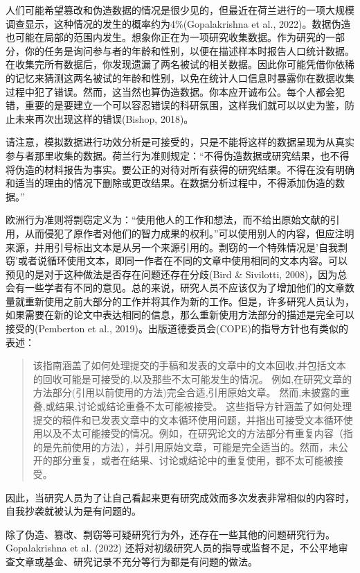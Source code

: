 \documentclass[
  letterpaper,
  DIV=11,
  numbers=noendperiod]{scrreprt}
\begin{document}
人们可能希望篡改和伪造数据的情况是很少见的，但最近在荷兰进行的一项大规模调查显示，这种情况的发生的概率约为4\%(Gopalakrishna
et al.,
2022)。数据伪造也可能在局部的范围内发生。想象你正在为一项研究收集数据。作为研究的一部分，你的任务是询问参与者的年龄和性别，以便在描述样本时报告人口统计数据。在收集完所有数据后，你发现遗漏了两名被试的相关数据。因此你可能凭借你依稀的记忆来猜测这两名被试的年龄和性别，以免在统计人口信息时暴露你在数据收集过程中犯了错误。然而，这当然也算伪造数据。你本应开诚布公。每个人都会犯错，重要的是要建立一个可以容忍错误的科研氛围，这样我们就可以以史为鉴，防止未来再次出现这样的错误(Bishop,
2018)。

请注意，模拟数据进行功效分析是可接受的，只是不能将这样的数据呈现为从真实参与者那里收集的数据。荷兰行为准则规定：``不得伪造数据或研究结果，也不得将伪造的材料报告为事实。要公正的对待对所有获得的研究结果。不得在没有明确和适当的理由的情况下删除或更改结果。在数据分析过程中，不得添加伪造的数据。''

欧洲行为准则将剽窃定义为：``使用他人的工作和想法，而不给出原始文献的引用，从而侵犯了原作者对他们的智力成果的权利。''可以使用别人的内容，但应注明来源，并用引号标出文本是从另一个来源引用的。剽窃的一个特殊情况是'自我剽窃'或者说循环使用文本，即同一作者在不同的文章中使用相同的文本内容。可以预见的是对于这种做法是否存在问题还存在分歧(Bird
\& Sivilotti,
2008)，因为总会有一些学者有不同的意见。总的来说，研究人员不应该仅为了增加他们的文章数量就重新使用之前大部分的工作并将其作为新的工作。但是，许多研究人员认为，如果需要在新的论文中表达相同的信息，那么重新使用方法部分的描述是完全可以接受的(Pemberton
et al., 2019)。出版道德委员会(COPE)的指导方针也有类似的表述：

\begin{quote}
该指南涵盖了如何处理提交的手稿和发表的文章中的文本回收,并包括文本的回收可能是可接受的,以及那些不太可能发生的情况。
例如,在研究文章的方法部分(引用以前使用的方法)完全合适,引用原始文章。
然而,未披露的重叠,或结果,讨论或结论重叠不太可能被接受。
这些指导方针涵盖了如何处理提交的稿件和已发表文章中的文本循环使用问题，并指出可接受文本循环使用以及不太可能接受的情况。例如，在研究论文的方法部分有重复内容（指的是先前使用的方法），并引用原始文章，可能是完全适当的。然而，未公开的部分重复，或者在结果、讨论或结论中的重复使用，都不太可能被接受。
\end{quote}

因此，当研究人员为了让自己看起来更有研究成效而多次发表非常相似的内容时，自我抄袭就被认为是有问题的。

除了伪造、篡改、剽窃等可疑研究行为外，还存在一些其他的问题研究行为。Gopalakrishna
et al. (2022)
还将对初级研究人员的指导或监督不足，不公平地审查文章或基金、研究记录不充分等行为都是有问题的做法。
\end{document}
